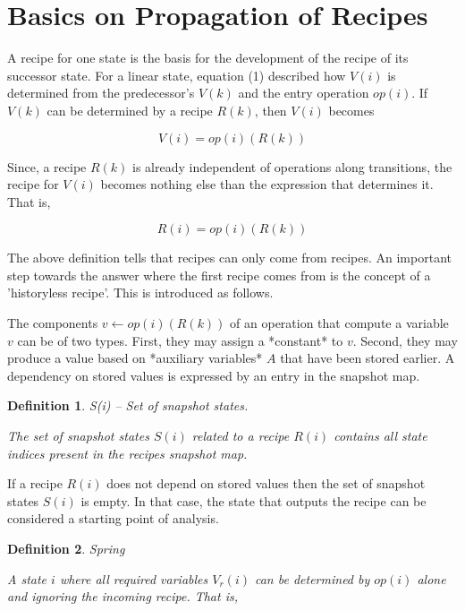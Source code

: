 \documentclass[12pt,a4paper]{scrartcl}
\theoremstyle{break}
\newtheorem{definition}{Definition}
\begin{document}
\section{Basics on Propagation of Recipes}

A recipe for one state is the basis for the development of the recipe of its
successor state. For a linear state, equation (1) described how $V(i)$ is
determined from the predecessor's $V(k)$ and the entry operation $op(i)$. If
$V(k)$ can be determined by a recipe $R(k)$, then $V(i)$ becomes

\begin{equation} \label{eq:accumulation2}
                     V(i) = op(i)(R(k))                                     
\end{equation}

Since, a recipe $R(k)$ is already independent of operations along transitions,
the recipe for $V(i)$ becomes nothing else than the expression that
determines it. That is,

\begin{equation} \label{eq:accumulation3}
                     R(i) = { op(i)(R(k)) }                                 
\end{equation}
                 
The above definition tells that recipes can only come from recipes. An
important step towards the answer where the first recipe comes from is the
concept of a 'historyless recipe'. This is introduced as follows. 

The components $v \leftarrow op(i)(R(k))$ of an operation that compute a variable $v$
can be of two types. First, they may assign a *constant* to $v$. Second, they may
produce a value based on *auxiliary variables* $A$ that have been stored earlier.
A dependency on stored values is expressed by an entry in the snapshot map.

\begin{definition}
S(i) -- Set of snapshot states.

The set of snapshot states $S(i)$ related to a recipe $R(i)$ contains
all state indices present in the recipes snapshot map.
\end{definition}

If a recipe $R(i)$ does not depend on stored values then the set of snapshot
states $S(i)$ is empty. In that case, the state that outputs the recipe can 
be considered a starting point of analysis.

\begin{definition}
Spring

A state $i$ where all required variables $V_r(i)$ can be determined by 
$op(i)$ alone and ignoring the incoming recipe. That is, 
\end{definition}
\end{document}
